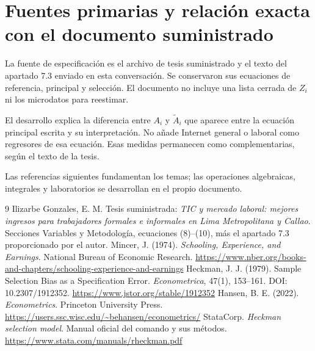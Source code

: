 \documentclass[11pt,a4paper]{article}
\begin{document}
\clearpage
\section{Fuentes primarias y relación exacta con el documento suministrado}

La fuente de especificación es el archivo de tesis suministrado y el texto del apartado 7.3 enviado en esta conversación. Se conservaron sus ecuaciones de referencia, principal y selección. El documento no incluye una lista cerrada de $Z_i$ ni los microdatos para reestimar.

El desarrollo explica la diferencia entre $A_i$ y $\widetilde A_i$ que aparece entre la ecuación principal escrita y su interpretación. No añade Internet general o laboral como regresores de esa ecuación. Esas medidas permanecen como complementarias, según el texto de la tesis.

Las referencias siguientes fundamentan los temas; las operaciones algebraicas, integrales y laboratorios se desarrollan en el propio documento.
\begin{thebibliography}{9}
 Ilizarbe Gonzales, E. M. Tesis suministrada: \emph{TIC y mercado laboral: mejores ingresos para trabajadores formales e informales en Lima Metropolitana y Callao}. Secciones Variables y Metodología, ecuaciones (8)--(10), más el apartado 7.3 proporcionado por el autor.
 Mincer, J. (1974). \emph{Schooling, Experience, and Earnings}. National Bureau of Economic Research.
\url{https://www.nber.org/books-and-chapters/schooling-experience-and-earnings}
 Heckman, J. J. (1979). Sample Selection Bias as a Specification Error. \emph{Econometrica}, 47(1), 153--161. DOI: 10.2307/1912352.
\url{https://www.jstor.org/stable/1912352}
 Hansen, B. E. (2022). \emph{Econometrics}. Princeton University Press.
\url{https://users.ssc.wisc.edu/~behansen/econometrics/}
 StataCorp. \emph{Heckman selection model}. Manual oficial del comando y sus métodos.
\url{https://www.stata.com/manuals/rheckman.pdf}
\end{thebibliography}
\end{document}
